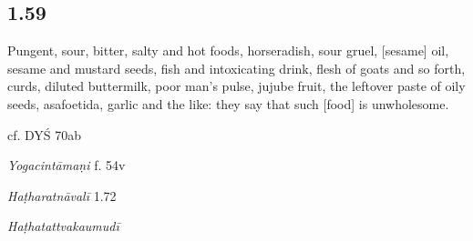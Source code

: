 \begin{ekdosis}
\begin{philcomm}[hp01_058]
\end{philcomm}

\subsection*{1.59}
\begin{translation}[hp01_059]
 Pungent, sour, bitter, salty and hot foods, horseradish, sour gruel, [sesame] oil, sesame and mustard seeds, fish and intoxicating drink, flesh of goats and so forth, curds, diluted buttermilk, poor man's pulse, jujube fruit, the leftover paste of oily seeds, asafoetida, garlic and the like: they say that such [food] is unwholesome.
\end{translation}

\begin{sources}[hp01_059]
cf. DYŚ 70ab
\end{sources}

\begin{testimonia}[hp01_059]
\emph{Yogacintāmaṇi} f. 54v

\begin{versinnote}
\end{versinnote}

\emph{Haṭharatnāvalī} 1.72

\begin{versinnote}
\end{versinnote}

\emph{Haṭhatattvakaumudī}

\begin{versinnote}
\end{versinnote}


\end{testimonia}
\end{ekdosis}

